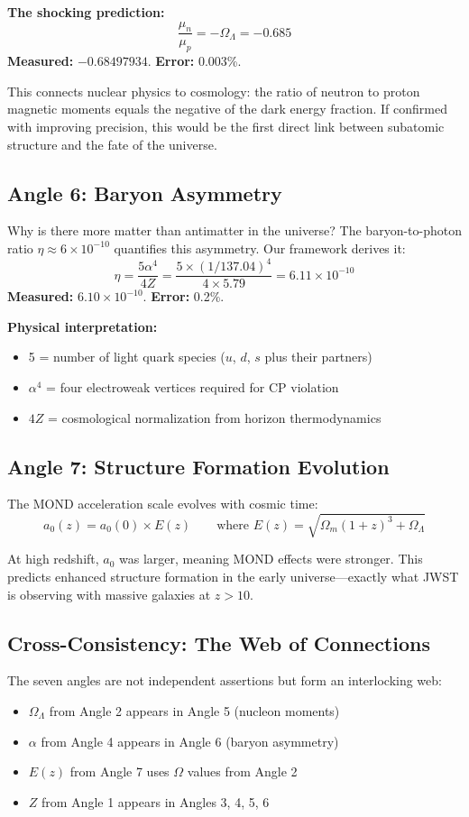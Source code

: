 \documentclass[11pt,a4paper]{article}
\theoremstyle{plain}
\theoremstyle{definition}
\theoremstyle{remark}
\newcommand{\Omegam}{\Omega_m}
\newcommand{\OmegaL}{\Omega_\Lambda}
\begin{document}
\textbf{The shocking prediction:}
\[
\frac{\mu_n}{\mu_p} = -\OmegaL = -0.685
\]
\textbf{Measured:} $-0.68497934$. \textbf{Error:} 0.003\%.

This connects nuclear physics to cosmology: the ratio of neutron to proton magnetic moments equals the negative of the dark energy fraction. If confirmed with improving precision, this would be the first direct link between subatomic structure and the fate of the universe.

\subsection{Angle 6: Baryon Asymmetry}

Why is there more matter than antimatter in the universe? The baryon-to-photon ratio $\eta \approx 6 \times 10^{-10}$ quantifies this asymmetry. Our framework derives it:
\[
\eta = \frac{5\alpha^4}{4Z} = \frac{5 \times (1/137.04)^4}{4 \times 5.79} = 6.11 \times 10^{-10}
\]
\textbf{Measured:} $6.10 \times 10^{-10}$. \textbf{Error:} 0.2\%.

\textbf{Physical interpretation:}
\begin{itemize}
  \item 5 = number of light quark species ($u$, $d$, $s$ plus their partners)
  \item $\alpha^4$ = four electroweak vertices required for CP violation
  \item $4Z$ = cosmological normalization from horizon thermodynamics
\end{itemize}

\subsection{Angle 7: Structure Formation Evolution}

The MOND acceleration scale evolves with cosmic time:
\[
a_0(z) = a_0(0) \times E(z) \qquad \text{where } E(z) = \sqrt{\Omegam(1+z)^3 + \OmegaL}
\]

At high redshift, $a_0$ was larger, meaning MOND effects were stronger. This predicts enhanced structure formation in the early universe---exactly what JWST is observing with massive galaxies at $z > 10$.

\subsection{Cross-Consistency: The Web of Connections}

The seven angles are not independent assertions but form an interlocking web:
\begin{itemize}
  \item $\OmegaL$ from Angle 2 appears in Angle 5 (nucleon moments)
  \item $\alpha$ from Angle 4 appears in Angle 6 (baryon asymmetry)
  \item $E(z)$ from Angle 7 uses $\Omega$ values from Angle 2
  \item $Z$ from Angle 1 appears in Angles 3, 4, 5, 6
\end{itemize}
\end{document}
